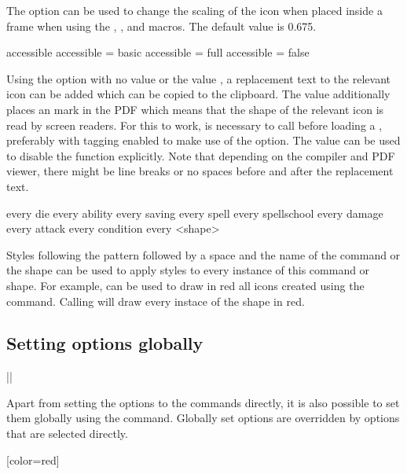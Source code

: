 \documentclass[a4paper]{article}
\begin{document}
The  option can be used to change the scaling of the icon when placed inside a frame when using the \macro{\ability}, \macro{\saving}, \macro{\spellschool} and \macro{\damage} macros. The default value is 0.675.

\begin{macrodef}
accessible
accessible = basic
accessible = full
accessible = false
\end{macrodef}
Using the  option with no value or the value , a replacement text to the relevant icon can be added which can be copied to the clipboard. The value  additionally places an \macro{\Alt} mark in the PDF which means that the shape of the relevant icon is read by screen readers. For this to work, is necessary to call \macro{\DocumentMetadata{}} before loading a \macro{\documentclass}, preferably with tagging enabled to make use of the  option. The value  can be used to disable the function explicitly. Note that depending on the compiler and PDF viewer, there might be line breaks or no spaces before and after the replacement text. 

\begin{macrodef}
every die
every ability
every saving
every spell
every spellschool
every damage
every attack
every condition
every <shape>
\end{macrodef}
Styles following the pattern  followed by a space and the name of the command or the shape can be used to apply styles to every instance of this command or shape. For example,  can be used to draw in red all icons created using the \macro{\die} command. Calling  will draw every instace of the  shape in red.

\subsection{Setting options globally}

\begin{macrodef}
|\dndiconsset|
\end{macrodef}
Apart from setting the options to the commands directly, it is also possible to set them globally using the \macro{\dndiconsset} command. Globally set options are overridden by options that are selected directly.

\begin{codeexample}

[color=red]
\end{codeexample}
\end{document}
